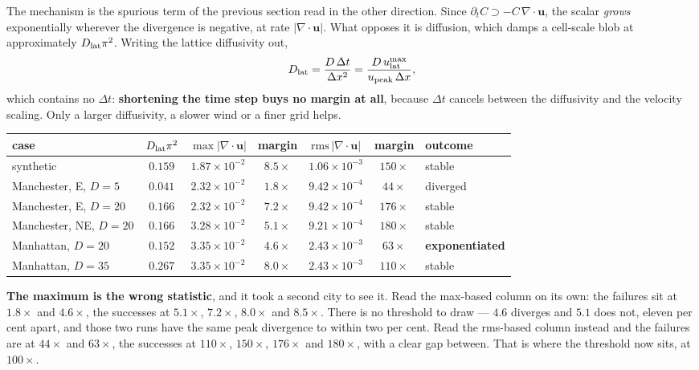 \documentclass[11pt,a4paper]{article}
\newcommand{\uu}{\bm{u}}
\begin{document}
The mechanism is the spurious term of the previous section read in the other
direction. Since
$\partial_t C \supset -C\,\nabla\!\cdot\!\uu$, the scalar \emph{grows}
exponentially wherever the divergence is negative, at rate
$|\nabla\!\cdot\!\uu|$. What opposes it is diffusion, which damps a
cell-scale blob at approximately $D_{\rm lat}\pi^2$. Writing the lattice
diffusivity out,
\begin{equation}
  D_{\rm lat} = \frac{D\,\Delta t}{\Delta x^2}
              = \frac{D\,u_{\rm lat}^{\max}}{u_{\rm peak}\,\Delta x},
  \label{eq:dlat}
\end{equation}
which contains no $\Delta t$: \textbf{shortening the time step buys no margin
at all}, because $\Delta t$ cancels between the diffusivity and the velocity
scaling. Only a larger diffusivity, a slower wind or a finer grid helps.

\begin{center}
\begin{tabular}{lcccccl}
\toprule
case & $D_{\rm lat}\pi^2$ &
$\max|\nabla\!\cdot\!\uu|$ & margin &
$\mathrm{rms}\,|\nabla\!\cdot\!\uu|$ & margin & outcome \\
\midrule
synthetic              & $0.159$ & $1.87\!\times\!10^{-2}$ & $8.5\times$ & $1.06\!\times\!10^{-3}$ & $150\times$ & stable \\
Manchester, E, $D=5$   & $0.041$ & $2.32\!\times\!10^{-2}$ & $1.8\times$ & $9.42\!\times\!10^{-4}$ & $44\times$  & diverged \\
Manchester, E, $D=20$  & $0.166$ & $2.32\!\times\!10^{-2}$ & $7.2\times$ & $9.42\!\times\!10^{-4}$ & $176\times$ & stable \\
Manchester, NE, $D=20$ & $0.166$ & $3.28\!\times\!10^{-2}$ & $5.1\times$ & $9.21\!\times\!10^{-4}$ & $180\times$ & stable \\
Manhattan, $D=20$      & $0.152$ & $3.35\!\times\!10^{-2}$ & $4.6\times$ & $2.43\!\times\!10^{-3}$ & $63\times$  & \textbf{exponentiated} \\
Manhattan, $D=35$      & $0.267$ & $3.35\!\times\!10^{-2}$ & $8.0\times$ & $2.43\!\times\!10^{-3}$ & $110\times$ & stable \\
\bottomrule
\end{tabular}
\end{center}

\noindent \textbf{The maximum is the wrong statistic}, and it took a second city
to see it. Read the max-based column on its own: the failures sit at $1.8\times$
and $4.6\times$, the successes at $5.1\times$, $7.2\times$, $8.0\times$ and
$8.5\times$. There is no threshold to draw --- $4.6$ diverges and $5.1$ does not,
eleven per cent apart, and those two runs have the same peak divergence to within
two per cent. Read the rms-based column instead and the failures are at
$44\times$ and $63\times$, the successes at $110\times$, $150\times$, $176\times$
and $180\times$, with a clear gap between. That is where the threshold now sits,
at $100\times$.
\end{document}
